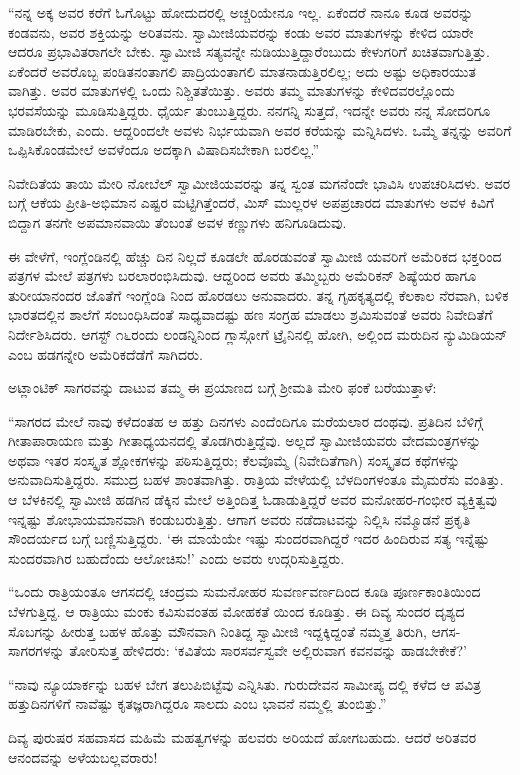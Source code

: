 “ನನ್ನ ಅಕ್ಕ ಅವರ ಕರೆಗೆ ಓಗೊಟ್ಟು ಹೋದುದರಲ್ಲಿ ಅಚ್ಚರಿಯೇನೂ ಇಲ್ಲ. ಏಕೆಂದರೆ ನಾನೂ ಕೂಡ ಅವರನ್ನು ಕಂಡವನು, ಅವರ ಶಕ್ತಿಯನ್ನು ಅರಿತವನು. ಸ್ವಾಮೀಜಿಯವರನ್ನು ಕಂಡು ಅವರ ಮಾತುಗಳನ್ನು ಕೇಳಿದ ಯಾರೇ ಆದರೂ ಪ್ರಭಾವಿತರಾಗಲೇ ಬೇಕು. ಸ್ವಾಮೀಜಿ ಸತ್ಯವನ್ನೇ ನುಡಿಯುತ್ತಿದ್ದಾರೆಂಬುದು ಕೇಳುಗರಿಗೆ ಖಚಿತವಾಗುತ್ತಿತ್ತು. ಏಕೆಂದರೆ ಅವರೊಬ್ಬ ಪಂಡಿತನಂತಾಗಲಿ ಪಾದ್ರಿಯಂತಾಗಲಿ ಮಾತನಾಡುತ್ತಿರಲಿಲ್ಲ; ಅದು ಅಷ್ಟು ಅಧಿಕಾರಯುತ ವಾಗಿತ್ತು. ಅವರ ಮಾತುಗಳಲ್ಲಿ ಒಂದು ನಿಶ್ಚಿತತೆಯಿತ್ತು. ಅವರು ತಮ್ಮ ಮಾತುಗಳನ್ನು ಕೇಳಿದವರಲ್ಲೊಂದು ಭರವಸೆಯನ್ನು ಮೂಡಿಸುತ್ತಿದ್ದರು. ಧೈರ್ಯ ತುಂಬುತ್ತಿದ್ದರು. ನನಗನ್ನಿ ಸುತ್ತದೆ, ಇದನ್ನೇ ಅವರು ನನ್ನ ಸೋದರಿಗೂ ಮಾಡಿರಬೇಕು, ಎಂದು. ಆದ್ದರಿಂದಲೇ ಅವಳು ನಿರ್ಭಯವಾಗಿ ಅವರ ಕರೆಯನ್ನು ಮನ್ನಿಸಿದಳು. ಒಮ್ಮೆ ತನ್ನನ್ನು ಅವರಿಗೆ ಒಪ್ಪಿಸಿಕೊಂಡಮೇಲೆ ಅವಳೆಂದೂ ಅದಕ್ಕಾಗಿ ವಿಷಾದಿಸಬೇಕಾಗಿ ಬರಲಿಲ್ಲ.”

ನಿವೇದಿತೆಯ ತಾಯಿ ಮೇರಿ ನೋಬೆಲ್ ಸ್ವಾಮೀಜಿಯವರನ್ನು ತನ್ನ ಸ್ವಂತ ಮಗನೆಂದೇ ಭಾವಿಸಿ ಉಪಚರಿಸಿದಳು. ಅವರ ಬಗ್ಗೆ ಆಕೆಯ ಪ್ರೀತಿ-ಅಭಿಮಾನ ಎಷ್ಟರ ಮಟ್ಟಿಗಿತ್ತೆಂದರೆ, ಮಿಸ್ ಮುಲ್ಲರಳ ಅಪಪ್ರಚಾರದ ಮಾತುಗಳು ಅವಳ ಕಿವಿಗೆ ಬಿದ್ದಾಗ ತನಗೇ ಅಪಮಾನವಾಯಿ ತೆಂಬಂತೆ ಅವಳ ಕಣ್ಣುಗಳು ಹನಿಗೂಡಿದುವು.

ಈ ವೇಳೆಗೆ, ಇಂಗ್ಲೆಂಡಿನಲ್ಲಿ ಹೆಚ್ಚು ದಿನ ನಿಲ್ಲದೆ ಕೂಡಲೇ ಹೊರಡುವಂತೆ ಸ್ವಾಮೀಜಿ ಯವರಿಗೆ ಅಮೆರಿಕದ ಭಕ್ತರಿಂದ ಪತ್ರಗಳ ಮೇಲೆ ಪತ್ರಗಳು ಬರಲಾರಂಭಿಸಿದುವು. ಆದ್ದರಿಂದ ಅವರು ತಮ್ಮಿಬ್ಬರು ಅಮೆರಿಕನ್ ಶಿಷ್ಯೆಯರ ಹಾಗೂ ತುರೀಯಾನಂದರ ಜೊತೆಗೆ ಇಂಗ್ಲೆಂಡಿ ನಿಂದ ಹೊರಡಲು ಅನುವಾದರು. ತನ್ನ ಗೃಹಕೃತ್ಯದಲ್ಲಿ ಕೆಲಕಾಲ ನೆರವಾಗಿ, ಬಳಿಕ ಭಾರತದಲ್ಲಿನ ಶಾಲೆಗೆ ಸಂಬಂಧಿಸಿದಂತೆ ಸಾಧ್ಯವಾದಷ್ಟು ಹಣ ಸಂಗ್ರಹ ಮಾಡಲು ಶ್ರಮಿಸುವಂತೆ ಅವರು ನಿವೇದಿತೆಗೆ ನಿರ್ದೇಶಿಸಿದರು. ಆಗಸ್ಟ್ ೧೬ರಂದು ಲಂಡನ್ನಿನಿಂದ ಗ್ಲಾಸ್ಗೋಗೆ ಟ್ರೈನಿನಲ್ಲಿ ಹೋಗಿ, ಅಲ್ಲಿಂದ ಮರುದಿನ  ನ್ಯುಮಿಡಿಯನ್ ಎಂಬ ಹಡಗನ್ನೇರಿ ಅಮೆರಿಕದೆಡೆಗೆ ಸಾಗಿದರು.

ಅಟ್ಲಾಂಟಿಕ್ ಸಾಗರವನ್ನು ದಾಟುವ ತಮ್ಮ ಈ ಪ್ರಯಾಣದ ಬಗ್ಗೆ ಶ್ರೀಮತಿ ಮೇರಿ ಫಂಕೆ ಬರೆಯುತ್ತಾಳೆ:

“ಸಾಗರದ ಮೇಲೆ ನಾವು ಕಳೆದಂತಹ ಆ ಹತ್ತು ದಿನಗಳು ಎಂದೆಂದಿಗೂ ಮರೆಯಲಾರ ದಂಥವು. ಪ್ರತಿದಿನ ಬೆಳಿಗ್ಗೆ ಗೀತಾಪಾರಾಯಣ ಮತ್ತು ಗೀತಾಧ್ಯಯನದಲ್ಲಿ ತೊಡಗಿರುತ್ತಿದ್ದೆವು. ಅಲ್ಲದೆ ಸ್ವಾಮೀಜಿಯವರು ವೇದಮಂತ್ರಗಳನ್ನು ಅಥವಾ ಇತರ ಸಂಸ್ಕೃತ ಶ್ಲೋಕಗಳನ್ನು ಪಠಿಸುತ್ತಿದ್ದರು; ಕೆಲವೊಮ್ಮೆ (ನಿವೇದಿತೆಗಾಗಿ) ಸಂಸ್ಕೃತದ ಕಥೆಗಳನ್ನು ಅನುವಾದಿಸುತ್ತಿದ್ದರು. ಸಮುದ್ರ ಬಹಳ ಶಾಂತವಾಗಿತ್ತು. ರಾತ್ರಿಯ ವೇಳೆಯಲ್ಲಿ ಬೆಳದಿಂಗಳಂತೂ ಮೈಮರೆಸು ವಂತಿತ್ತು. ಆ ಬೆಳಕಿನಲ್ಲಿ ಸ್ವಾಮೀಜಿ ಹಡಗಿನ ಡೆಕ್ಕಿನ ಮೇಲೆ ಅತ್ತಿಂದಿತ್ತ ಓಡಾಡುತ್ತಿದ್ದರೆ ಅವರ ಮನೋಹರ-ಗಂಭೀರ ವ್ಯಕ್ತಿತ್ವವು ಇನ್ನಷ್ಟು ಶೋಭಾಯಮಾನವಾಗಿ ಕಂಡುಬರುತ್ತಿತ್ತು. ಆಗಾಗ ಅವರು ನಡೆದಾಟವನ್ನು ನಿಲ್ಲಿಸಿ ನಮ್ಮೊಡನೆ ಪ್ರಕೃತಿ ಸೌಂದರ್ಯದ ಬಗ್ಗೆ ಬಣ್ಣಿಸುತ್ತಿದ್ದರು. ‘ಈ ಮಾಯೆಯೇ ಇಷ್ಟು ಸುಂದರವಾಗಿದ್ದರೆ ಇದರ ಹಿಂದಿರುವ ಸತ್ಯ ಇನ್ನೆಷ್ಟು ಸುಂದರವಾಗಿರ ಬಹುದೆಂದು ಆಲೋಚಿಸು!’ ಎಂದು ಅವರು ಉದ್ಗರಿಸುತ್ತಿದ್ದರು.

“ಒಂದು ರಾತ್ರಿಯಂತೂ ಆಗಸದಲ್ಲಿ ಚಂದ್ರಮ ಸುಮನೋಹರ ಸುವರ್ಣವರ್ಣದಿಂದ ಕೂಡಿ ಪೂರ್ಣಕಾಂತಿಯಿಂದ ಬೆಳಗುತ್ತಿದ್ದ. ಆ ರಾತ್ರಿಯು ಮಂಕು ಕವಿಸುವಂತಹ ಮೋಹಕತೆ ಯಿಂದ ಕೂಡಿತ್ತು. ಈ ದಿವ್ಯ ಸುಂದರ ದೃಶ್ಯದ ಸೊಬಗನ್ನು ಹೀರುತ್ತ ಬಹಳ ಹೊತ್ತು ಮೌನವಾಗಿ ನಿಂತಿದ್ದ ಸ್ವಾಮೀಜಿ ಇದ್ದಕ್ಕಿದ್ದಂತೆ ನಮ್ಮತ್ತ ತಿರುಗಿ, ಆಗಸ-ಸಾಗರಗಳನ್ನು ತೋರಿಸುತ್ತ ಹೇಳಿದರು: ‘ಕವಿತೆಯ ಸಾರಸರ್ವಸ್ವವೇ ಅಲ್ಲಿರುವಾಗ ಕವನವನ್ನು ಹಾಡಬೇಕೇಕೆ?’

“ನಾವು ನ್ಯೂಯಾರ್ಕನ್ನು ಬಹಳ ಬೇಗ ತಲುಪಿಬಿಟ್ಟೆವು ಎನ್ನಿಸಿತು. ಗುರುದೇವನ ಸಾಮೀಪ್ಯ ದಲ್ಲಿ ಕಳೆದ ಆ ಪವಿತ್ರ ಹತ್ತುದಿನಗಳಿಗೆ ನಾವೆಷ್ಟು ಕೃತಜ್ಞರಾಗಿದ್ದರೂ ಸಾಲದು ಎಂಬ ಭಾವನೆ ನಮ್ಮಲ್ಲಿ ತುಂಬಿತ್ತು.”

ದಿವ್ಯ ಪುರುಷರ ಸಹವಾಸದ ಮಹಿಮೆ ಮಹತ್ವಗಳನ್ನು ಹಲವರು ಅರಿಯದೆ ಹೋಗಬಹುದು. ಆದರೆ ಅರಿತವರ ಆನಂದವನ್ನು ಅಳೆಯಬಲ್ಲವರಾರು!

